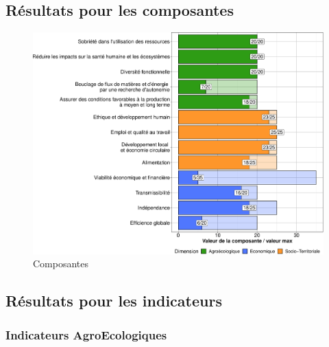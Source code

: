\documentclass[]{article}
\begin{document}
\hypertarget{ruxe9sultats-pour-les-composantes}{%
\subsection{Résultats pour les
composantes}\label{ruxe9sultats-pour-les-composantes}}

\begin{figure}[H]
\includegraphics[width=1\linewidth]{report_files/figure-latex/unnamed-chunk-5-1} \caption{Composantes}\label{fig:unnamed-chunk-5}
\end{figure}

\hypertarget{ruxe9sultats-pour-les-indicateurs}{%
\subsection{Résultats pour les
indicateurs}\label{ruxe9sultats-pour-les-indicateurs}}

\hypertarget{indicateurs-agroecologiques}{%
\subsubsection{Indicateurs
AgroEcologiques}\label{indicateurs-agroecologiques}}
\end{document}
